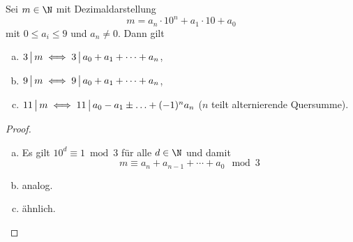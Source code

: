 \begin{st}[Teilbarkeitskriterien] \label{1.16}
	Sei $m \in \N$ mit Dezimaldarstellung
	\[
		m = a_n \cdot 10^n + a_1 \cdot 10 + a_0
	\]
	mit $0 \le a_i \le 9$ und $a_n \neq 0$.
	Dann gilt
	\begin{enumerate}[a)]
		\item
			$3 \divs m \iff 3 \divs a_0 + a_1 + \dotsb + a_n$,
		\item
			$9 \divs m \iff 9 \divs a_0 + a_1 + \dotsb + a_n$,
		\item
			$11 \divs m \iff 11 \divs a_0 - a_1 \pm \dotsc + (-1)^n a_n$ ($n$ teilt alternierende Quersumme).
	\end{enumerate}
	\begin{proof}
		\begin{enumerate}[a)]
			\item
				Es gilt $10^d \equiv 1 \bmod 3$ für alle $d \in \N$ und damit
				\[
					m \equiv a_n + a_{n-1} + \dotsb + a_0 \mod 3
				\]
			\item
				analog.
			\item
				ähnlich.
		\end{enumerate}
	\end{proof}
\end{st}
